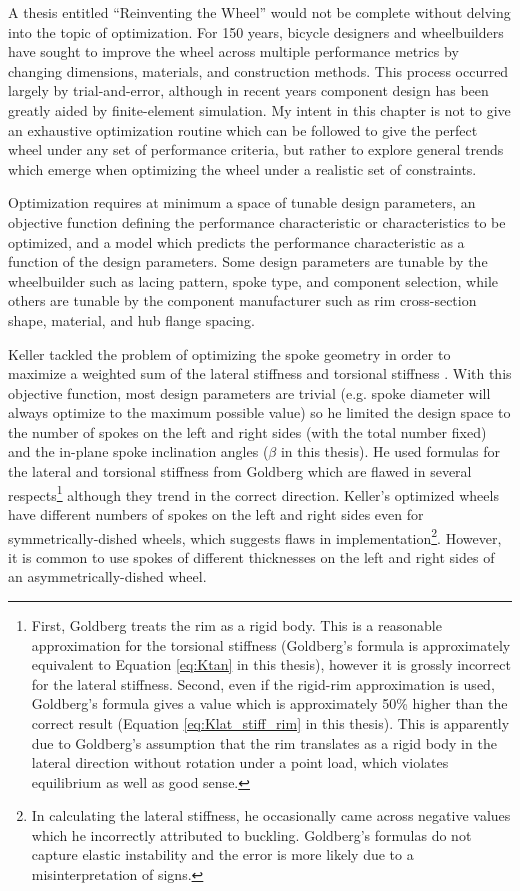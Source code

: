 \documentclass[\rootdir/thesis.tex]{subfiles}
\begin{document}
A thesis entitled ``Reinventing the Wheel'' would not be complete without delving into the topic of optimization. For 150 years, bicycle designers and wheelbuilders have sought to improve the wheel across multiple performance metrics by changing dimensions, materials, and construction methods. This process occurred largely by trial-and-error, although in recent years component design has been greatly aided by finite-element simulation. My intent in this chapter is not to give an exhaustive optimization routine which can be followed to give the perfect wheel under any set of performance criteria, but rather to explore general trends which emerge when optimizing the wheel under a realistic set of constraints.

Optimization requires at minimum a space of tunable design parameters, an objective function defining the performance characteristic or characteristics to be optimized, and a model which predicts the performance characteristic as a function of the design parameters. Some design parameters are tunable by the wheelbuilder such as lacing pattern, spoke type, and component selection, while others are tunable by the component manufacturer such as rim cross-section shape, material, and hub flange spacing.

Keller tackled the problem of optimizing the spoke geometry in order to maximize a weighted sum of the lateral stiffness and torsional stiffness \cite{Keller2013}. With this objective function, most design parameters are trivial (e.g. spoke diameter will always optimize to the maximum possible value) so he limited the design space to the number of spokes on the left and right sides (with the total number fixed) and the in-plane spoke inclination angles ($\beta$ in this thesis). He used formulas for the lateral and torsional stiffness from Goldberg \cite{Goldberg1984} which are flawed in several respects\footnote{First, Goldberg treats the rim as a rigid body. This is a reasonable approximation for the torsional stiffness (Goldberg's formula is approximately equivalent to Equation \ref{eq:Ktan} in this thesis), however it is grossly incorrect for the lateral stiffness. Second, even if the rigid-rim approximation is used, Goldberg's formula gives a value which is approximately 50\% higher than the correct result (Equation \ref{eq:Klat_stiff_rim} in this thesis). This is apparently due to Goldberg's assumption that the rim translates as a rigid body in the lateral direction without rotation under a point load, which violates equilibrium as well as good sense.} although they trend in the correct direction. Keller's optimized wheels have different numbers of spokes on the left and right sides even for symmetrically-dished wheels, which suggests flaws in implementation\footnote{In calculating the lateral stiffness, he occasionally came across negative values which he incorrectly attributed to buckling. Goldberg's formulas do not capture elastic instability and the error is more likely due to a misinterpretation of signs.}. However, it is common to use spokes of different thicknesses on the left and right sides of an asymmetrically-dished wheel.
\end{document}
